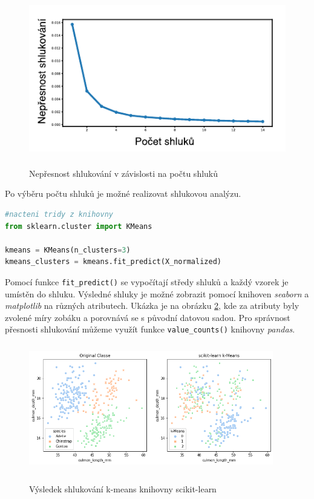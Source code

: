 \begin{figure}[h]\centering
  \centering
  \includegraphics[width=\textwidth,height=2.7in]{obrazky/k-err.pdf}\\[1pt]
  \caption{Nepřesnost shlukování v závislosti na počtu shluků}
  \label{k-err}
\end{figure}

Po výběru počtu shluků je možné realizovat shlukovou analýzu. 

\begin{mdframed}
\begin{lstlisting}[language=Python]
#nacteni tridy z knihovny
from sklearn.cluster import KMeans

kmeans = KMeans(n_clusters=3)
kmeans_clusters = kmeans.fit_predict(X_normalized)
\end{lstlisting}   
\end{mdframed}
Pomocí funkce \verb|fit_predict()| se vypočítají středy shluků a každý vzorek je umístěn do shluku. Výsledné shluky je možné zobrazit pomocí knihoven \textit{seaborn} a \textit{matplotlib} na různých atributech. Ukázka je na obrázku \ref{k-means}, kde za atributy byly zvolené míry zobáku a porovnává se s původní datovou sadou. Pro správnost přesnosti shlukování můžeme využít funkce \verb|value_counts()| knihovny \textit{pandas}. 

\begin{figure}[h]\centering
  \centering
  \includegraphics[width=4.2in,height=2.2in]{obrazky/kmeans.png}\\[1pt]
  \caption{Výsledek shlukování k-means knihovny scikit-learn}
  \label{k-means}
\end{figure}

